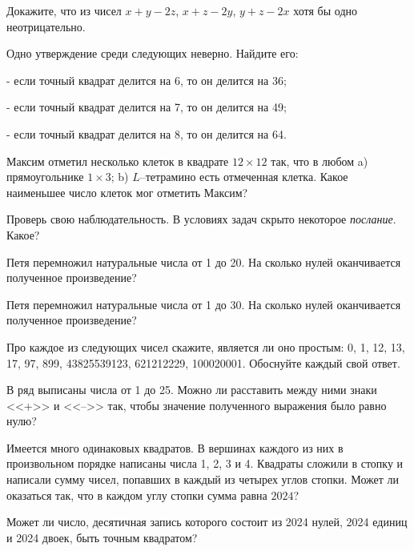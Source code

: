\documentclass{article}
\begin{document}
\begin{enumerate_boxed}
        \item Докажите, что из чисел $x+y-2z$, $x+z-2y$, $y+z-2x$ хотя бы одно неотрицательно.

        \item Одно утверждение среди следующих неверно.
        Найдите его:

        - если точный квадрат делится на 6, то он делится на 36;

        - если точный квадрат делится на 7, то он делится на 49;

        - если точный квадрат делится на 8, то он делится на 64.

        \item Максим отметил несколько клеток в квадрате $12 \times 12$ так, что в любом a) прямоугольнике $1 \times 3$; b) $L$--тетрамино есть отмеченная клетка.
        Какое наименьшее число клеток мог отметить Максим?

        \item Проверь свою наблюдательность.
        В условиях задач скрыто некоторое \emph{послание}.
        Какое?

        \item Петя перемножил натуральные числа от 1 до 20.
        На сколько нулей оканчивается полученное произведение?

        \item Петя перемножил натуральные числа от 1 до 30.
        На сколько нулей оканчивается полученное произведение?

        \item Про каждое из следующих чисел скажите, является ли оно простым: 0, 1, 12, 13, 17, 97, 899, 43825539123, 621212229, 100020001.
        Обоснуйте каждый свой ответ.

        \item В ряд выписаны числа от 1 до 25.
        Можно ли расставить между
        ними знаки <<+>> и <<-->> так, чтобы значение полученного выражения
        было равно нулю?

        \item Имеется много одинаковых квадратов.
        В вершинах каждого из них в произвольном порядке написаны числа 1, 2, 3 и 4.
        Квадраты сложили в стопку и написали сумму чисел, попавших в каждый из четырех углов стопки.
        Может ли оказаться так, что в каждом углу стопки сумма равна $2024$?


        \item Может ли число, десятичная запись которого состоит из 2024 нулей, 2024 единиц и 2024 двоек, быть точным квадратом?



\end{enumerate_boxed}
\end{document}
